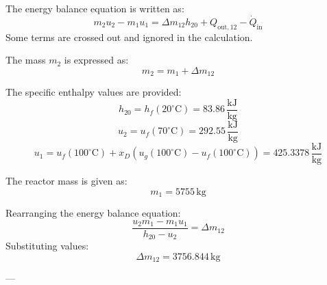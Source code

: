 The energy balance equation is written as:  
\[
m_2 u_2 - m_1 u_1 = \Delta m_{12} h_{20} + Q_{\text{out},12} - \dot{Q}_{\text{in}}
\]  
Some terms are crossed out and ignored in the calculation.

The mass \( m_2 \) is expressed as:  
\[
m_2 = m_1 + \Delta m_{12}
\]  

The specific enthalpy values are provided:  
\[
h_{20} = h_f(20^\circ\text{C}) = 83.86 \, \frac{\text{kJ}}{\text{kg}}
\]  
\[
u_2 = u_f(70^\circ\text{C}) = 292.55 \, \frac{\text{kJ}}{\text{kg}}
\]  
\[
u_1 = u_f(100^\circ\text{C}) + x_D \left( u_g(100^\circ\text{C}) - u_f(100^\circ\text{C}) \right) = 425.3378 \, \frac{\text{kJ}}{\text{kg}}
\]  

The reactor mass is given as:  
\[
m_1 = 5755 \, \text{kg}
\]  

Rearranging the energy balance equation:  
\[
\frac{u_2 m_1 - m_1 u_1}{h_{20} - u_2} = \Delta m_{12}
\]  
Substituting values:  
\[
\Delta m_{12} = 3756.844 \, \text{kg}
\]  

---